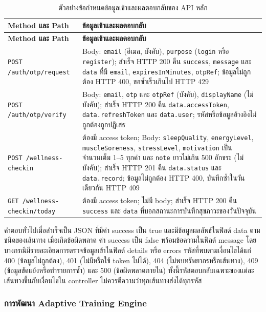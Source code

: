 \begin{longtable}{|>{\raggedright\arraybackslash}p{}|>{\raggedright\arraybackslash}p{}|}
\caption{ตัวอย่างข้อกำหนดข้อมูลเข้าและผลตอบกลับของ API หลัก}\label{tab:api-spec-contract}\\
\hline
\textbf{Method และ Path} & \textbf{ข้อมูลเข้าและผลตอบกลับ} \\ \hline
\endfirsthead
\hline
\textbf{Method และ Path} & \textbf{ข้อมูลเข้าและผลตอบกลับ} \\ \hline
\endhead
\texttt{POST /auth/otp/request} & Body: \texttt{email} (อีเมล, บังคับ), \texttt{purpose} (\texttt{login} หรือ \texttt{register}); สำเร็จ HTTP 200 คืน \texttt{success}, \texttt{message} และ \texttt{data} ที่มี \texttt{email}, \texttt{expiresInMinutes}, \texttt{otpRef}; ข้อมูลไม่ถูกต้อง HTTP 400, ขอซ้ำเร็วเกินไป HTTP 429 \\ \hline
\texttt{POST /auth/otp/verify} & Body: \texttt{email}, \texttt{otp} และ \texttt{otpRef} (บังคับ), \texttt{displayName} (ไม่บังคับ); สำเร็จ HTTP 200 คืน \texttt{data.accessToken}, \texttt{data.refreshToken} และ \texttt{data.user}; รหัสหรือข้อมูลอ้างอิงไม่ถูกต้องถูกปฏิเสธ \\ \hline
\texttt{POST /wellness-checkin} & ต้องมี access token; Body: \texttt{sleepQuality}, \texttt{energyLevel}, \texttt{muscleSoreness}, \texttt{stressLevel}, \texttt{motivation} เป็นจำนวนเต็ม 1--5 ทุกค่า และ \texttt{note} ยาวไม่เกิน 500 อักขระ (ไม่บังคับ); สำเร็จ HTTP 201 คืน \texttt{data.status} และ \texttt{data.record}; ข้อมูลไม่ถูกต้อง HTTP 400, บันทึกซ้ำในวันเดียวกัน HTTP 409 \\ \hline
\texttt{GET /wellness-checkin/today} & ต้องมี access token; ไม่มี body; สำเร็จ HTTP 200 คืน \texttt{success} และ \texttt{data} ที่บอกสถานะการบันทึกสุขภาวะของวันปัจจุบัน \\ \hline
\end{longtable}

คำตอบทั่วไปเมื่อสำเร็จเป็น JSON ที่มีค่า success เป็น true และมีข้อมูลผลลัพธ์ในฟิลด์ data ตามชนิดของเส้นทาง เมื่อเกิดข้อผิดพลาด ค่า success เป็น false พร้อมข้อความในฟิลด์ message โดยบางกรณีมีรายละเอียดการตรวจข้อมูลเข้าในฟิลด์ details หรือ errors รหัสที่พบตามเงื่อนไขได้แก่ 400 (ข้อมูลไม่ถูกต้อง), 401 (ไม่มีหรือใช้ token ไม่ได้), 404 (ไม่พบทรัพยากรหรือเส้นทาง), 409 (ข้อมูลขัดแย้งหรือทำรายการซ้ำ) และ 500 (ข้อผิดพลาดภายใน) ทั้งนี้รหัสตอบกลับเฉพาะของแต่ละเส้นทางขึ้นกับเงื่อนไขใน controller ไม่ควรตีความว่าทุกเส้นทางส่งได้ทุกรหัส

\subsubsection{การพัฒนา Adaptive Training Engine}

